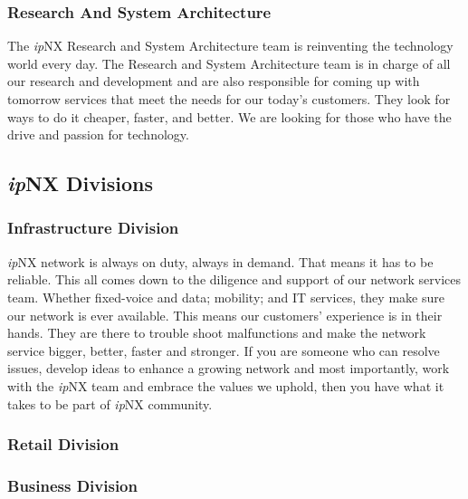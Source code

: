 \subsubsection{Research And System Architecture}
The \textit{ip}NX Research and System Architecture team is reinventing the technology world every day. The Research and System Architecture team is in charge of all our research and development and are also responsible for coming up with tomorrow services that meet the needs for our today’s customers. They look for ways to do it cheaper, faster, and better. We are looking for those who have the drive and passion for technology.
\subsection{\textit{ip}NX Divisions}
\subsubsection{Infrastructure Division}
\textit{ip}NX network is always on duty, always in demand. That means it has to be reliable. This all comes down to the diligence and support of our network services team.  Whether fixed-voice and data; mobility; and IT services, they make sure our network is ever available. This means our customers’ experience is in their hands. They are there to trouble shoot malfunctions and make the network service bigger, better, faster and stronger. If you are someone who can resolve issues, develop ideas to enhance a growing network and most importantly, work with the \textit{ip}NX team and embrace the values we uphold, then you have what it takes to be part of \textit{ip}NX community.
\subsubsection{Retail Division}
\subsubsection{Business Division}